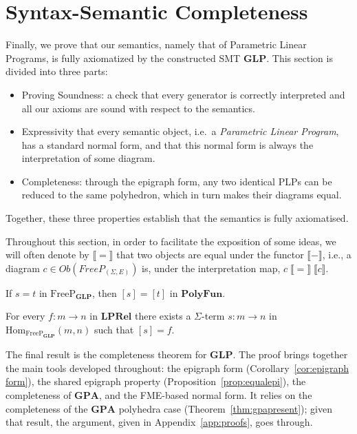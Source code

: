 \section{Syntax-Semantic Completeness}\label{sec:complete}

Finally, we prove that our semantics, namely that of Parametric Linear Programs, is fully axiomatized by the constructed SMT \textbf{GLP}. This section is divided into three parts:


\begin{itemize}
	\item Proving Soundness: a check that every
	      generator is correctly interpreted and all our axioms
	      are sound with respect to the semantics.
	\item Expressivity that every semantic object, i.e.\ a
	      \textit{Parametric Linear Program}, has a standard normal form, and
	      that this normal form is always the interpretation of some diagram.
	\item Completeness: through the epigraph form, any two identical PLPs
	      can be reduced to the same polyhedron, which in turn makes their diagrams equal.
\end{itemize}

Together, these three properties establish that the semantics is fully axiomatised.

Throughout this section, in order to facilitate the exposition of some ideas, we will often denote by $\llbracket = \rrbracket$ that two objects are equal under the functor $\llbracket - \rrbracket$, i.e., a diagram $c \in Ob(FreeP_{(\Sigma,E)})$ is, under the interpretation map, $c \; \llbracket = \rrbracket \; \llbracket c \rrbracket$.

\begin{lemma}[Soundness]\label{lem:soundness}
	If $s = t$ in $\mathrm{FreeP}_{\mathbf{GLP}}$, then $[s] = [t]$
	in $\mathbf{PolyFun}$.
\end{lemma}

\begin{lemma}[Expressivity]\label{lem:expressivity}
	For every $f : m \to n$ in $\mathbf{LPRel}$ there exists a
	$\Sigma$-term $s : m \to n$ in
	$\mathrm{Hom}_{\mathrm{FreeP}_{\mathbf{GLP}}}(m,n)$
	such that $[s] = f$.
\end{lemma}

The final result is the completeness theorem for
$\mathbf{GLP}$. The proof brings together the main tools developed
throughout: the epigraph form (Corollary~\ref{cor:epigraph form}), the
shared epigraph property (Proposition~\ref{prop:equalepi}), the
completeness of $\mathbf{GPA}$, and the FME-based normal form. It
relies on the completeness of the $\mathbf{GPA}$
polyhedra case (Theorem~\ref{thm:gpapresent}); given
that result, the argument, given in Appendix~\ref{app:proofs}, goes through.

